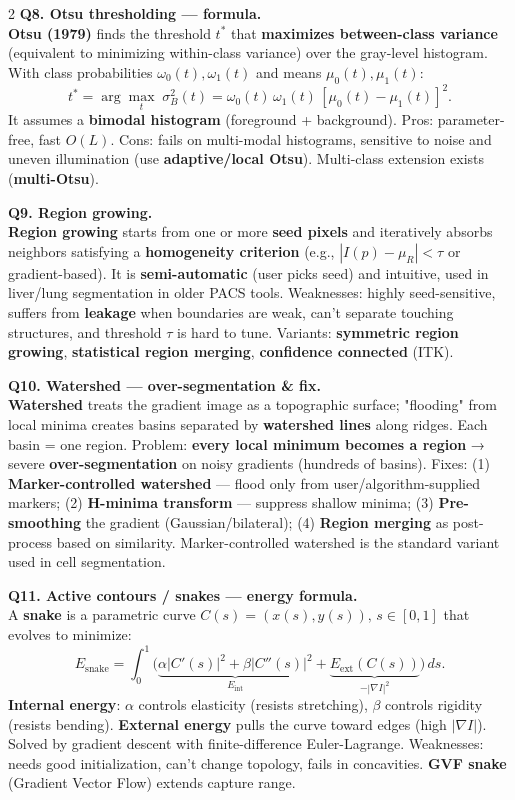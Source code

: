 \begin{paracol}{2}
\textbf{Q8. Otsu thresholding — formula.}\\
\textbf{Otsu (1979)} finds the threshold $t^*$ that \textbf{maximizes between-class variance} (equivalent to minimizing within-class variance) over the gray-level histogram. With class probabilities $\omega_0(t),\omega_1(t)$ and means $\mu_0(t),\mu_1(t)$:
\[t^*=\arg\max_t \;\sigma_B^2(t)=\omega_0(t)\,\omega_1(t)\,[\mu_0(t)-\mu_1(t)]^2.\]
It assumes a \textbf{bimodal histogram} (foreground + background). Pros: parameter-free, fast $O(L)$. Cons: fails on multi-modal histograms, sensitive to noise and uneven illumination (use \textbf{adaptive/local Otsu}). Multi-class extension exists (\textbf{multi-Otsu}).

\textbf{Q9. Region growing.}\\
\textbf{Region growing} starts from one or more \textbf{seed pixels} and iteratively absorbs neighbors satisfying a \textbf{homogeneity criterion} (e.g., $|I(p)-\mu_R|<\tau$ or gradient-based). It is \textbf{semi-automatic} (user picks seed) and intuitive, used in liver/lung segmentation in older PACS tools. Weaknesses: highly seed-sensitive, suffers from \textbf{leakage} when boundaries are weak, can't separate touching structures, and threshold $\tau$ is hard to tune. Variants: \textbf{symmetric region growing}, \textbf{statistical region merging}, \textbf{confidence connected} (ITK).

\textbf{Q10. Watershed — over-segmentation \& fix.}\\
\textbf{Watershed} treats the gradient image as a topographic surface; "flooding" from local minima creates basins separated by \textbf{watershed lines} along ridges. Each basin = one region. Problem: \textbf{every local minimum becomes a region} → severe \textbf{over-segmentation} on noisy gradients (hundreds of basins). Fixes: (1) \textbf{Marker-controlled watershed} — flood only from user/algorithm-supplied markers; (2) \textbf{H-minima transform} — suppress shallow minima; (3) \textbf{Pre-smoothing} the gradient (Gaussian/bilateral); (4) \textbf{Region merging} as post-process based on similarity. Marker-controlled watershed is the standard variant used in cell segmentation.

\textbf{Q11. Active contours / snakes — energy formula.}\\
A \textbf{snake} is a parametric curve $C(s)=(x(s),y(s)),\,s\in[0,1]$ that evolves to minimize:
\[E_{\text{snake}}=\int_0^1\!\!\big(\underbrace{\alpha|C'(s)|^2+\beta|C''(s)|^2}_{E_{\text{int}}}+\underbrace{E_{\text{ext}}(C(s))}_{-|\nabla I|^2}\big)\,ds.\]
\textbf{Internal energy}: $\alpha$ controls elasticity (resists stretching), $\beta$ controls rigidity (resists bending). \textbf{External energy} pulls the curve toward edges (high $|\nabla I|$). Solved by gradient descent with finite-difference Euler-Lagrange. Weaknesses: needs good initialization, can't change topology, fails in concavities. \textbf{GVF snake} (Gradient Vector Flow) extends capture range.


\end{paracol}
